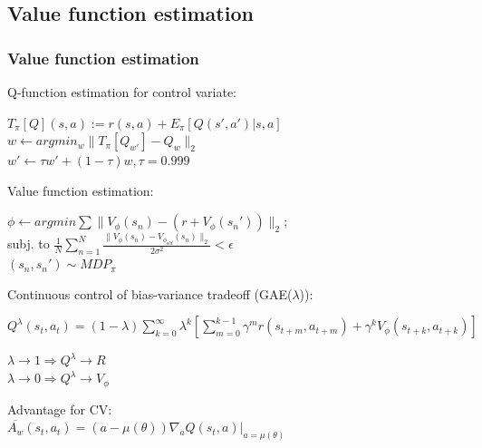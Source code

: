 \documentclass{beamer}
\begin{document}
\subsection{Value function estimation}
\begin{frame}

\frametitle{Value function estimation}
Q-function estimation for control variate:\\

\begin{center}
\vspace{1mm}
{
$T_\pi[Q](s,a) := r(s,a) + E_\pi[Q(s',a') | s,a]$\\

$w \leftarrow argmin_w \| T_\pi[Q_{w'}] - Q_w \|_2$\\
\vspace{1mm}
$ w' \leftarrow \tau w' + (1-\tau) w, \tau = 0.999$
}
\end{center}

\vspace{4mm}

Value function estimation:\\

\begin{center}
\vspace{1mm}
{
$\phi \leftarrow argmin \sum \| V_\phi(s_n) - (r + V_\phi(s_n')) \|_2$;\\

subj. to $\frac{1}{N} \sum_{n=1}^N \frac{\| V_\phi(s_n) - V_{\phi_{old}}(s_n) \|_2} {2\sigma^2} < \epsilon$\\
\vspace{1mm}
$(s_n,s_n') \sim MDP_\pi$
}

\end{center}

\end{frame}

\begin{frame}


Continuous control of bias-variance tradeoff (GAE($\lambda$)):\\

{
\setlength{\parindent}{1cm}
\hangindent=1cm
\vspace{3mm}
$Q^\lambda (s_t,a_t) = (1-\lambda) \sum_{k=0}^{\infty} \lambda^k \left[ \sum_{m=0}^{k-1} \gamma^m r(s_{t+m}, a_{t+m}) + \gamma^{k} V_\phi  (s_{t+k}, a_{t+k}) \right]$

\vspace{1.5mm}
$\lambda \rightarrow 1 \Rightarrow Q^\lambda \rightarrow R$\\
$\lambda \rightarrow 0 \Rightarrow Q^\lambda \rightarrow V_\phi$\\
}

\vspace{4mm}
Advantage for CV:\\
{
\vspace{3mm}
\setlength{\parindent}{1cm}
\hangindent=1cm
$\overline{A_w} (s_t,a_t) = (a - \mu(\theta) )\nabla_a Q(s_t,a)|_{a=\mu(\theta)}$
}

\end{frame}
\end{document}
